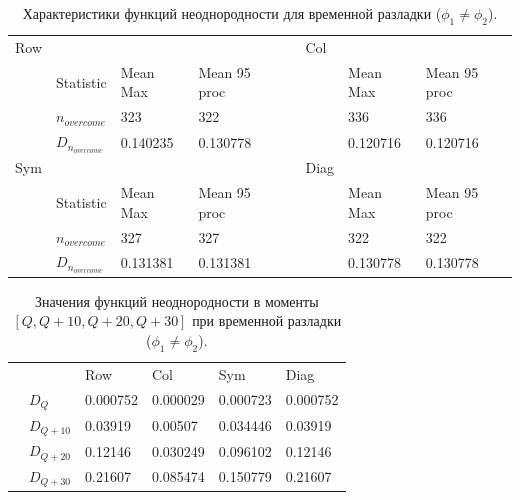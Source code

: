 \documentclass[specialist, substylefile = spbu.rtx,
			   subf, href, 12pt]{disser}
\begin{document}
\newpage

\begin{table}[!hhh]
	\center
	\caption{Характеристики функций неоднородности для временной разладки ($\phi_1 \neq \phi_2$).}
	\begin{tabular}{llllllll}
		Row & 				   & 		  	  & 			 && Col & 		      & 			      \\
		& Statistic        & Mean Max 	  & Mean 95 proc && 	& Mean Max     & Mean 95 proc     \\
		& $n_{overcome}$   & 323   	  & 322      &&     & 336       & 336 		  \\
		&$D_{n_{overcome}}$& 0.140235		  &	0.130778	 &&     & 0.120716		  &   0.120716             \\
		Sym & 				   & 		  	  & 			 && Diag& 		      & 			      \\
		& Statistic        & Mean Max 	  & Mean 95 proc && 	& Mean Max     & Mean 95 proc     \\
		& $n_{overcome}$   & 327   	  & 327      &&     & 322      & 322		  \\
		&$D_{n_{overcome}}$& 0.131381		  &	0.131381		 &&     & 0.130778		 & 0.130778             \\
	\end{tabular}
	\label{tab:TemporaryHeterogeneityShifted}
\end{table}


\begin{table}[!hhh]
	\center
	\caption{Значения функций неоднородности в моменты $ [Q, Q+10, Q+20, Q+30] $ при временной разладки ($\phi_1 \neq \phi_2$). }
	\begin{tabular}{llllll}
		&              & Row 	  & Col 	& Sym    & Diag  \\
		& $D_Q$        & 0.000752	  & 0.000029 	& 0.000723 & 0.000752		\\
		& $D_{Q+10}$   & 0.03919   & 0.00507  & 0.034446 & 0.03919	\\
		& $D_{Q+20}$   & 0.12146   & 0.030249  & 0.096102 & 0.12146	\\
		& $D_{Q+30}$   & 0.21607	  &	0.085474	& 0.150779 & 0.21607	
	\end{tabular}
	\label{tab:TemporaryHeterogeneityShiftedValues}
\end{table}
\end{document}
